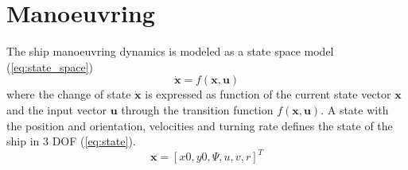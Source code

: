 \section{Manoeuvring} \label{sec:manoeuvring}
The ship manoeuvring dynamics is modeled as a state space model (\autoref{eq:state_space})
\begin{equation}
    \dot{\mathbf{x}}=f(\mathbf{x},\mathbf{u})
    \label{eq:state_space}
\end{equation}
where the change of state $\dot{\mathbf{x}}$ is expressed as function of the current state vector $\mathbf{x}$ and the input vector $\mathbf{u}$ through the transition function $f(\mathbf{x},\mathbf{u})$. A state with the position and orientation, velocities and turning rate defines the state of the ship in 3 DOF (\autoref{eq:state}). 
\begin{equation}
    \mathbf{x} = [x0,y0,\Psi, u,v,r]^T
    \label{eq:state}
\end{equation}

